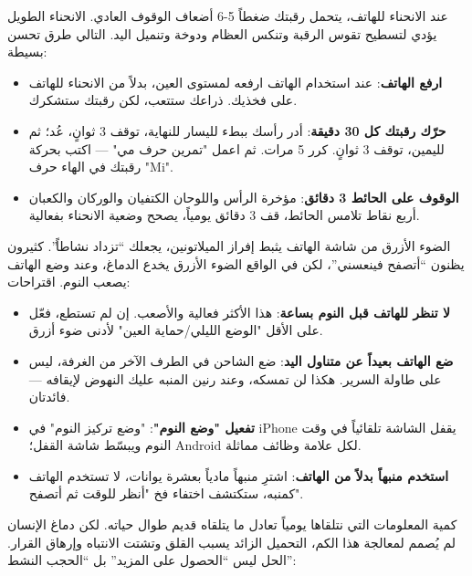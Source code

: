 عند الانحناء للهاتف، يتحمل رقبتك ضغطاً 5-6 أضعاف الوقوف العادي. الانحناء الطويل يؤدي لتسطيح تقوس الرقبة وتنكس العظام ودوخة وتنميل اليد. التالي طرق تحسن بسيطة:

\begin{itemize}
  \item \textbf{ارفع الهاتف}: عند استخدام الهاتف ارفعه لمستوى العين، بدلاً من الانحناء للهاتف على فخذيك. ذراعك ستتعب، لكن رقبتك ستشكرك.
  \item \textbf{حرّك رقبتك كل 30 دقيقة}: أدر رأسك ببطء لليسار للنهاية، توقف 3 ثوانٍ، عُد؛ ثم لليمين، توقف 3 ثوانٍ. كرر 5 مرات. ثم اعمل "تمرين حرف مي" — اكتب بحركة رقبتك في الهاء حرف "Mi".
  \item \textbf{الوقوف على الحائط 3 دقائق}: مؤخرة الرأس واللوحان الكتفيان والوركان والكعبان أربع نقاط تلامس الحائط، قف 3 دقائق يومياً، يصحح وضعية الانحناء بفعالية.
\end{itemize}


الضوء الأزرق من شاشة الهاتف يثبط إفراز الميلاتونين، يجعلك “تزداد نشاطاً”. كثيرون يظنون “أتصفح فينعسني”، لكن في الواقع الضوء الأزرق يخدع الدماغ، وعند وضع الهاتف يصعب النوم. اقتراحات:

\begin{itemize}
  \item \textbf{لا تنظر للهاتف قبل النوم بساعة}: هذا الأكثر فعالية والأصعب. إن لم تستطع، فعّل على الأقل "الوضع الليلي/حماية العين" لأدنى ضوء أزرق.
  \item \textbf{ضع الهاتف بعيداً عن متناول اليد}: ضع الشاحن في الطرف الآخر من الغرفة، ليس على طاولة السرير. هكذا لن تمسكه، وعند رنين المنبه عليك النهوض لإيقافه — فائدتان.
  \item \textbf{تفعيل "وضع النوم"}: "وضع تركيز النوم" في iPhone يقفل الشاشة تلقائياً في وقت النوم ويبسّط شاشة القفل؛ Android لكل علامة وظائف مماثلة.
  \item \textbf{استخدم منبهاً بدلاً من الهاتف}: اشترِ منبهاً مادياً بعشرة يوانات، لا تستخدم الهاتف كمنبه، ستكتشف اختفاء فخ "أنظر للوقت ثم أتصفح".
\end{itemize}


كمية المعلومات التي نتلقاها يومياً تعادل ما يتلقاه قديم طوال حياته. لكن دماغ الإنسان لم يُصمم لمعالجة هذا الكم، التحميل الزائد يسبب القلق وتشتت الانتباه وإرهاق القرار. الحل ليس “الحصول على المزيد” بل “الحجب النشط”:

